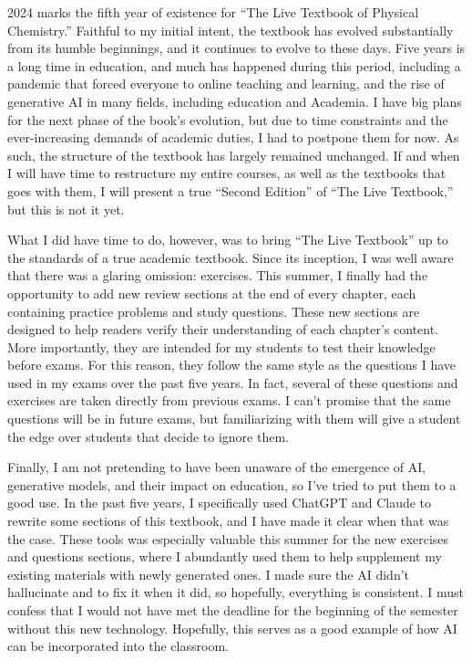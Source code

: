 \documentclass[
  9pt,
]{extbook}
\theoremstyle{definition}
\theoremstyle{definition}
\theoremstyle{definition}
\theoremstyle{definition}
\theoremstyle{remark}
\begin{document}
2024 marks the fifth year of existence for ``The Live Textbook of Physical Chemistry.'' Faithful to my initial intent, the textbook has evolved substantially from its humble beginnings, and it continues to evolve to these days. Five years is a long time in education, and much has happened during this period, including a pandemic that forced everyone to online teaching and learning, and the rise of generative AI in many fields, including education and Academia. I have big plans for the next phase of the book's evolution, but due to time constraints and the ever-increasing demands of academic duties, I had to postpone them for now. As such, the structure of the textbook has largely remained unchanged. If and when I will have time to restructure my entire courses, as well as the textbooks that goes with them, I will present a true ``Second Edition'' of ``The Live Textbook,'' but this is not it yet.

What I did have time to do, however, was to bring ``The Live Textbook'' up to the standards of a true academic textbook. Since its inception, I was well aware that there was a glaring omission: exercises. This summer, I finally had the opportunity to add new review sections at the end of every chapter, each containing practice problems and study questions. These new sections are designed to help readers verify their understanding of each chapter's content. More importantly, they are intended for my students to test their knowledge before exams. For this reason, they follow the same style as the questions I have used in my exams over the past five years. In fact, several of these questions and exercises are taken directly from previous exams. I can't promise that the same questions will be in future exams, but familiarizing with them will give a student the edge over students that decide to ignore them.

Finally, I am not pretending to have been unaware of the emergence of AI, generative models, and their impact on education, so I've tried to put them to a good use. In the past five years, I specifically used ChatGPT and Claude to rewrite some sections of this textbook, and I have made it clear when that was the case. These tools was especially valuable this summer for the new exercises and questions sections, where I abundantly used them to help supplement my existing materials with newly generated ones. I made sure the AI didn't hallucinate and to fix it when it did, so hopefully, everything is consistent. I must confess that I would not have met the deadline for the beginning of the semester without this new technology. Hopefully, this serves as a good example of how AI can be incorporated into the classroom.
\end{document}
